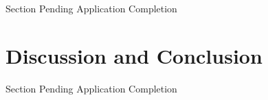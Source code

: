 \documentclass[letterpaper, 10pt,DIV=13]{scrartcl}
\begin{document}
\begin{multicols}{2}
\begin{spacing}{1.25}
Section Pending Application Completion

\end{spacing}

\vspace{-2.5pt}

\section*{Discussion and Conclusion}
\begin{spacing}{1.25}

Section Pending Application Completion

\end{spacing}

\vspace{-2.5pt}




\end{multicols}
\end{document}
